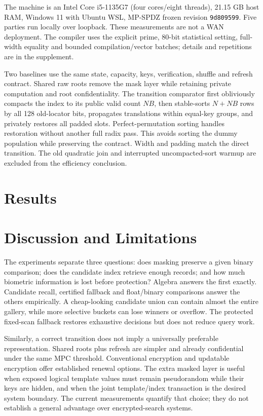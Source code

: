 \documentclass[journal]{IEEEtran}
\begin{document}
The machine is an Intel Core i5-1135G7 (four cores/eight threads), 21.15 GB host RAM, Windows 11 with Ubuntu WSL, MP-SPDZ frozen revision \texttt{9d809599}. Five parties run locally over loopback. These measurements are not a WAN deployment. The compiler uses the explicit prime, 80-bit statistical setting, full-width equality and bounded compilation/vector batches; details and repetitions are in the supplement.

Two baselines use the same state, capacity, keys, verification, shuffle and refresh contract. Shared raw roots remove the mask layer while retaining private computation and root confidentiality. The transition comparator first obliviously compacts the index to its public valid count $NB$, then stable-sorts $N+NB$ rows by all 128 old-locator bits, propagates translations within equal-key groups, and privately restores all padded slots. Perfect-permutation sorting handles restoration without another full radix pass. This avoids sorting the dummy population while preserving the contract. Width and padding match the direct transition. The old quadratic join and interrupted uncompacted-sort warmup are excluded from the efficiency conclusion.

\section{Results}


\section{Discussion and Limitations}
The experiments separate three questions: does masking preserve a given binary comparison; does the candidate index retrieve enough records; and how much biometric information is lost before protection? Algebra answers the first exactly. Candidate recall, certified fallback and float/binary comparisons answer the others empirically. A cheap-looking candidate union can contain almost the entire gallery, while more selective buckets can lose winners or overflow. The protected fixed-scan fallback restores exhaustive decisions but does not reduce query work.

Similarly, a correct transition does not imply a universally preferable representation. Shared roots plus refresh are simpler and already confidential under the same MPC threshold. Conventional encryption and updatable encryption offer established renewal options. The extra masked layer is useful when exposed logical template values must remain pseudorandom while their keys are hidden, and when the joint template/index transaction is the desired system boundary. The current measurements quantify that choice; they do not establish a general advantage over encrypted-search systems.
\end{document}
